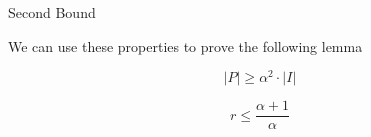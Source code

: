 \begin{frame}{Second Bound}

We can use these properties to prove the following lemma 

\begin{lemma}
$$ |P| \geq \alpha^2 \cdot |I| $$
\end{lemma}

\begin{corollary}
$$ r \leq \frac{\alpha + 1}{\alpha} $$
\end{corollary}


\end{frame}

